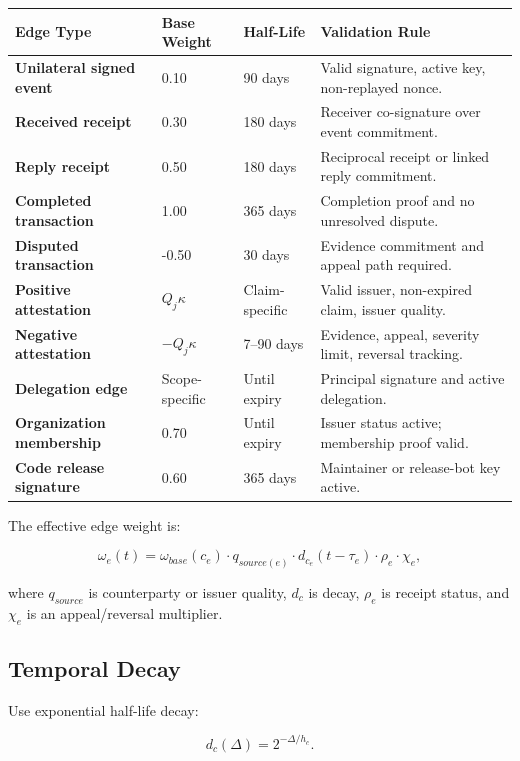 \documentclass[11pt]{article}
\begin{document}
\begin{longtable}{>{\bfseries}p{} p{} p{} p{}}
\toprule
Edge Type & Base Weight & Half-Life & Validation Rule \\
\midrule
Unilateral signed event & 0.10 & 90 days & Valid signature, active key, non-replayed nonce. \\
Received receipt & 0.30 & 180 days & Receiver co-signature over event commitment. \\
Reply receipt & 0.50 & 180 days & Reciprocal receipt or linked reply commitment. \\
Completed transaction & 1.00 & 365 days & Completion proof and no unresolved dispute. \\
Disputed transaction & -0.50 & 30 days & Evidence commitment and appeal path required. \\
Positive attestation & \(Q_j\kappa\) & Claim-specific & Valid issuer, non-expired claim, issuer quality. \\
Negative attestation & \(-Q_j\kappa\) & 7--90 days & Evidence, appeal, severity limit, reversal tracking. \\
Delegation edge & Scope-specific & Until expiry & Principal signature and active delegation. \\
Organization membership & 0.70 & Until expiry & Issuer status active; membership proof valid. \\
Code release signature & 0.60 & 365 days & Maintainer or release-bot key active. \\
\bottomrule
\end{longtable}

The effective edge weight is:

\begin{equation}
\omega_e(t)=\omega_{base}(c_e)\cdot q_{source(e)}\cdot d_{c_e}(t-\tau_e)\cdot \rho_e\cdot \chi_e,
\end{equation}

where \(q_{source}\) is counterparty or issuer quality, \(d_c\) is decay, \(\rho_e\) is receipt status, and \(\chi_e\) is an appeal/reversal multiplier.

\subsection{Temporal Decay}

Use exponential half-life decay:

\begin{equation}
d_c(\Delta)=2^{-\Delta/h_c}.
\end{equation}
\end{document}
